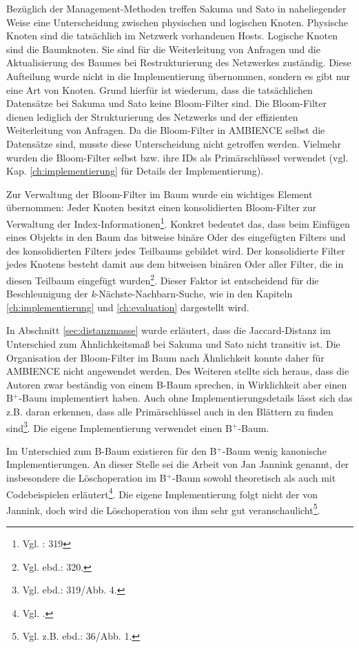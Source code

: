 Bezüglich der Management-Methoden treffen Sakuma und Sato in naheliegender Weise eine Unterscheidung zwischen physischen und logischen Knoten. Physische Knoten sind die tatsächlich im Netzwerk vorhandenen Hosts. Logische Knoten sind die Baumknoten. Sie sind für die Weiterleitung von Anfragen und die Aktualisierung des Baumes bei Restrukturierung des Netzwerkes zuständig. Diese Aufteilung wurde nicht in die Implementierung übernommen, sondern es gibt nur eine Art von Knoten. Grund hierfür ist wiederum, dass die tatsächlichen Datensätze bei Sakuma und Sato keine Bloom-Filter sind. Die Bloom-Filter dienen lediglich der Strukturierung des Netzwerks und der effizienten Weiterleitung von Anfragen. Da die Bloom-Filter in AMBIENCE selbst die Datensätze sind, musste diese Unterscheidung nicht getroffen werden. Vielmehr wurden die Bloom-Filter selbst bzw. ihre IDs als Primärschlüssel verwendet (vgl. Kap. \ref{ch:implementierung} für Details der Implementierung). 

Zur Verwaltung der Bloom-Filter im Baum wurde ein wichtiges Element übernommen: Jeder Knoten besitzt einen konsolidierten Bloom-Filter zur Verwaltung der Index-Informationen\footnote{Vgl. \cite{Sakuma2011}: 319}.  Konkret bedeutet das, dass beim Einfügen eines Objekts in den Baum das bitweise binäre Oder des eingefügten Filters und des konsolidierten Filters jedes Teilbaums gebildet wird. Der konsolidierte Filter jedes Knotens besteht damit aus dem bitweisen binären Oder aller Filter, die in diesen Teilbaum eingefügt wurden\footnote{Vgl. ebd.: 320.}. Dieser Faktor ist entscheidend für die Beschleunigung der \textit{k}-Nächste-Nachbarn-Suche, wie in den Kapiteln \ref{ch:implementierung} und \ref{ch:evaluation} dargestellt wird. 

In Abschnitt \ref{sec:distanzmasse} wurde erläutert, dass die Jaccard-Distanz im Unterschied zum Ähnlichkeitsmaß bei Sakuma und Sato nicht transitiv ist. Die Organisation der Bloom-Filter im Baum nach Ähnlichkeit konnte daher für AMBIENCE nicht angewendet werden. Des Weiteren stellte sich heraus, dass die Autoren zwar beständig von einem B-Baum sprechen, in Wirklichkeit aber einen B$^+$-Baum implementiert haben. Auch ohne Implementierungsdetails lässt sich das z.B. daran erkennen, dass alle Primärschlüssel auch in den Blättern zu finden sind\footnote{Vgl. ebd.: 319/Abb. 4.}. Die eigene Implementierung verwendet einen B$^+$-Baum. 

Im Unterschied zum B-Baum existieren für den B$^+$-Baum wenig kanonische Implementierungen. An dieser Stelle sei die Arbeit von Jan Jannink genannt, der insbesondere die Löschoperation im B$^+$-Baum sowohl theoretisch als auch mit Codebeispielen erläutert\footnote{Vgl. \cite{Jannink1995}.}. Die eigene Implementierung folgt nicht der von Jannink, doch wird die Löschoperation von ihm sehr gut veranschaulicht\footnote{Vgl. z.B. ebd.: 36/Abb. 1.}. 
